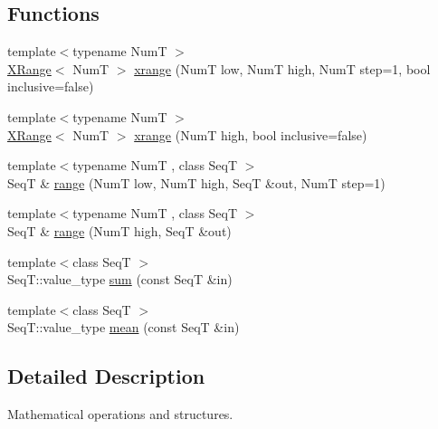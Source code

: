 \subsection*{Functions}
\begin{DoxyCompactItemize}
\item 
{\footnotesize template$<$typename Num\-T $>$ }\\\hyperlink{structseq_1_1math_1_1_x_range}{X\-Range}$<$ Num\-T $>$ \hyperlink{namespaceseq_1_1math_abfe793e999a374a4d5e6b1ef3f268b59}{xrange} (Num\-T low, Num\-T high, Num\-T step=1, bool inclusive=false)
\item 
{\footnotesize template$<$typename Num\-T $>$ }\\\hyperlink{structseq_1_1math_1_1_x_range}{X\-Range}$<$ Num\-T $>$ \hyperlink{namespaceseq_1_1math_a4f2c47e50ba86a80778ccebd31d7fa16}{xrange} (Num\-T high, bool inclusive=false)
\item 
{\footnotesize template$<$typename Num\-T , class Seq\-T $>$ }\\Seq\-T \& \hyperlink{namespaceseq_1_1math_a6bd86d848fb47f455aff84c38c175ea4}{range} (Num\-T low, Num\-T high, Seq\-T \&out, Num\-T step=1)
\item 
{\footnotesize template$<$typename Num\-T , class Seq\-T $>$ }\\Seq\-T \& \hyperlink{namespaceseq_1_1math_ae9b127e8277c6c390b99c4a1195dc087}{range} (Num\-T high, Seq\-T \&out)
\item 
{\footnotesize template$<$class Seq\-T $>$ }\\Seq\-T\-::value\-\_\-type \hyperlink{namespaceseq_1_1math_a27179daf6ca9a8d85434eda531fa134e}{sum} (const Seq\-T \&in)
\item 
{\footnotesize template$<$class Seq\-T $>$ }\\Seq\-T\-::value\-\_\-type \hyperlink{namespaceseq_1_1math_ab019165412bf99555adfeaaaa86f319f}{mean} (const Seq\-T \&in)
\end{DoxyCompactItemize}


\subsection{Detailed Description}
Mathematical operations and structures. 

